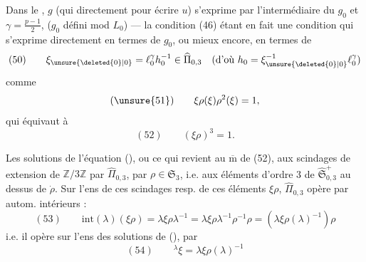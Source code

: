 

\uline{} Dans le ,  $g$  (qui  directement pour écrire $u$) s'exprime par l'intermédiaire du $g_0$  et $\gamma=\frac{p-1}{2}$,  ($g_0$ défini mod $L_0$) --- la condition (46) étant en fait une condition qui s'exprime directement en termes de $g_0$, ou mieux encore, en termes de
\[
(50)\qquad
\xi_{\unsure{\deleted{0}|0}}=\ell_0^\gamma h_0^{-1}\in\widehat{\Pi}_{0,3}
\quad\text{(d'où }h_0=\xi_{\unsure{\deleted{0}|0}}^{-1}\ell_0^\gamma\text{)}
\]
comme
\[
(\unsure{51})\qquad \xi\rho(\xi)\rho^2(\xi)=1,
\]
qui équivaut à
\[
(52)\qquad (\xi\rho)^3=1.
\]

Les solutions de l'équation (), ou ce qui revient au $\overline{\mathrm m}$ de (52),  aux scindages de extension  de $\mathbb Z/3\mathbb Z$ par $\widehat{\Pi}_{0,3}$,  par $\rho\in\mathfrak S_3$,  i.e. aux éléments d'ordre 3 de $\widehat{\mathfrak S}_{0,3}^{+}$ au dessus de $\dot\rho$.
Sur l'ens de ces scindages resp. de ces éléments $\xi\rho$, $\widehat{\Pi}_{0,3}$ opère par autom. intérieurs :
\[
(53)\qquad
\mathrm{int}(\lambda)(\xi\rho)
=\lambda\xi\rho\lambda^{-1}
=\lambda\xi\rho\lambda^{-1}\rho^{-1}\rho
=(\lambda\xi\rho(\lambda)^{-1})\rho
\]
i.e. il opère sur l'ens des solutions de (), par
\[
(54)\qquad {}^\lambda\xi=\lambda\xi\rho(\lambda)^{-1}
\]

